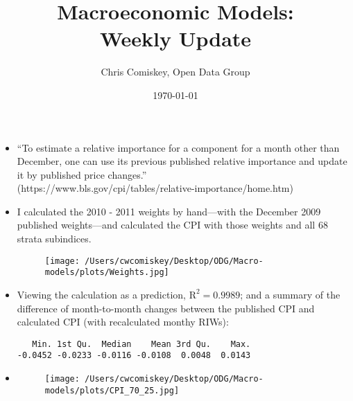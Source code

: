 \documentclass{article}
\title{Macroeconomic Models: \\ Weekly Update}
\author{Chris Comiskey, Open Data Group}
\date{\today}
\begin{document}
\maketitle{}

\begin{itemize}
\item ``To estimate a relative importance for a component for a month other than December, one can use its previous published relative importance and update it by published price changes.'' \\ (https://www.bls.gov/cpi/tables/relative-importance/home.htm)

\item I calculated the 2010 - 2011 weights by hand---with the December 2009 published weights---and calculated the CPI with those weights and all 68 strata subindices.
    \begin{figure}[H]
    \centering
    \texttt{[image: /Users/cwcomiskey/Desktop/ODG/Macro-models/plots/Weights.jpg]}
    \end{figure}
\item Viewing the calculation as a prediction, $\text{R}^{2} = 0.9989$; and a summary of the difference of month-to-month changes between the published CPI and calculated CPI (with recalculated monthy RIWs): 
\begin{verbatim}
   Min. 1st Qu.  Median    Mean 3rd Qu.    Max. 
-0.0452 -0.0233 -0.0116 -0.0108  0.0048  0.0143
\end{verbatim}
\item 
    \begin{figure}[H]
    \centering
    \texttt{[image: /Users/cwcomiskey/Desktop/ODG/Macro-models/plots/CPI\_70\_25.jpg]}
    \end{figure}

\end{itemize}
\end{document}
